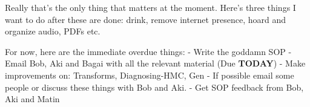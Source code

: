 \noindent {}

Really that's the only thing that matters at the moment. Here's three things I want to do after these are done: drink, remove internet presence, hoard and organize audio, PDFs etc.

For now, here are the immediate overdue things:
- Write the goddamn SOP
- Email Bob, Aki and Bagai with all the relevant material (Due \textbf{TODAY})
- Make improvements on: Transforms, Diagnosing-HMC, Gen
- If possible email some people or discuss these things with Bob and Aki. 
- Get SOP feedback from Bob, Aki and Matin